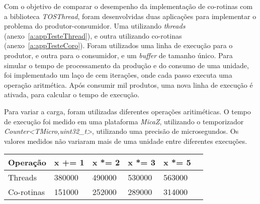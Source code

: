Com o objetivo de comparar o desempenho da implementação de co-rotinas com a biblioteca \textit{TOSThread}, foram
desenvolvidas duas aplicações para implementar o problema do produtor-consumidor.
Uma utilizando \textit{threads} (anexo~\ref{a:appTesteThread}), e outra utilizando co-rotinas (anexo~\ref{a:appTesteCoro}).
Foram utilizados uma linha de execução para o produtor, e outra para o consumidor, e um \textit{buffer} de tamanho
único. Para simular o tempo de processamento da produção e do consumo de uma unidade, foi implementado um laço de cem iterações, onde
cada passo executa uma operação aritmética. Após consumir mil produtos, uma nova linha de execução é ativada, para
calcular o tempo de execução.

Para variar a carga, foram utilizadas diferentes operações aritiméticas.
O tempo de execução foi medido em uma plataforma \textit{MicaZ}, utilizando o temporizador
\textit{Counter<TMicro,uint32\_t>}, utilizando uma precisão de microsegundos.
Os valores medidos não variaram mais de uma unidade entre diferentes execuções.
\begin{center}
    \begin{tabular}{ | l | l | l | l | l | p{5cm} |}
    \hline
    Operação    & x += 1 & x *= 2 & x *= 3 & x *= 5 \\ \hline
    Threads     & 380000 & 490000 & 530000 & 563000 \\ \hline 
    Co-rotinas  & 151000 & 252000 & 289000 & 314000 \\ \hline 
    \end{tabular}
\end{center}

